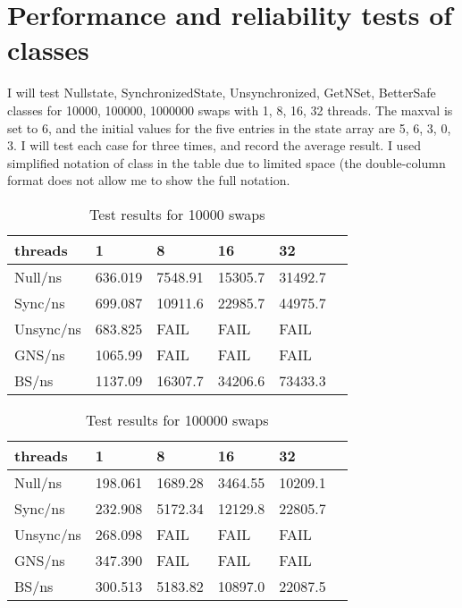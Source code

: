 \documentclass[letterpaper,twocolumn,10pt]{article}
\begin{document}
\section{Performance and reliability tests of classes}
I will test Nullstate, SynchronizedState, Unsynchronized, GetNSet, BetterSafe classes for 10000, 100000, 1000000 swaps with 1, 8, 16, 32 threads. The maxval is set to 6, and the initial values for the five entries in the state array are 5, 6, 3, 0, 3. I will test each case for three times, and record the average result. I used simplified notation of class in the table due to limited space (the double-column format does not allow me to show the full notation. \\

 
\begin{table}[h!]
\begin{tabular}{|l|l|l|l|l|l|}
\hline
threads             & 1              & 8       & 16      & 32      \\ \hline
Null/ns         & 636.019& 7548.91 & 15305.7 & 31492.7\\ \hline
Sync/ns & 699.087  & 10911.6 & 22985.7 & 44975.7 \\ \hline
Unsync/ns    & 683.825     & FAIL    & FAIL    & FAIL    \\ \hline
GNS/ns           & 1065.99     & FAIL    & FAIL    & FAIL    \\ \hline
BS/ns        & 1137.09 & 16307.7 & 34206.6 & 73433.3 \\ \hline
\end{tabular}
\caption{Test results for 10000 swaps}
\end{table}

\begin{table}[]
\begin{tabular}{|l|l|l|l|l|l|}
\hline
threads   & 1              & 8       & 16      & 32      \\ \hline
Null/ns   & 198.061  & 1689.28 & 3464.55 & 10209.1 \\ \hline
Sync/ns   & 232.908  & 5172.34 & 12129.8 & 22805.7 \\ \hline
Unsync/ns & 268.098    & FAIL    & FAIL    & FAIL    \\ \hline
GNS/ns    & 347.390     & FAIL    & FAIL    & FAIL    \\ \hline
BS/ns     & 300.513  & 5183.82 & 10897.0 & 22087.5 \\ \hline
\end{tabular}
\caption{Test results for 100000 swaps}
\end{table}
\end{document}
